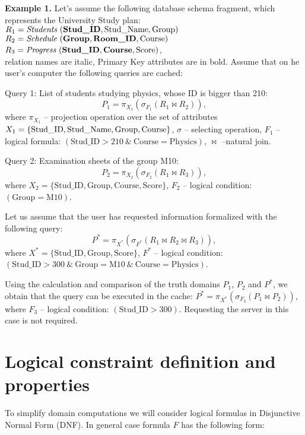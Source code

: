 \documentclass{article}
\begin{document}
{\bf Example 1.} Let's assume the following database schema fragment, which
represents the University Study plan:\\
$R_1 =\mbox{\it Students}\ (\mbox{\bf Stud\_ID}, \mbox{Stud\_Name},
\mbox{Group})$\\
$R_2 =\mbox{\it Schedule}\ (\mbox{\bf Group}, \mbox{\bf Room\_ID},
\mbox{Course})$\\
$R_3 =\mbox{\it Progress}\ (\mbox{\bf Stud\_ID}, \mbox{\bf Course},
\mbox{Score})$,\\
relation names are italic, Primary Key attributes are in bold. Assume that on 
he user's computer the following queries are cached:

Query 1: List of students studying physics, whose ID is bigger than 210:
$$P_1 = \pi_{X_1}(\sigma_{F_1} (R_1 \Join R_2)),$$
where $\pi_{X_1}$ -- projection operation over the set of attributes
$X_1 = \{\text{Stud\_ID},\\
\text{Stud\_Name}, \text{Group}, \text{Course}\}$,
$\sigma$ -- selecting operation,
$F_1$ -- logical formula: $(\text{Stud\_ID} > 210\ \&\ \text{Course} =
\text{Physics})$, $\Join$ --natural join.

Query 2: Examination sheets of the group M10:
$$P_2 = \pi_{X_2}(\sigma_{F_2} (R_1 \Join R_3)),$$
where
$X_2 = \{\text{Stud\_ID}, \text{Group}, \text{Course}, \text{Score}\}$, $F_2$
-- logical condition:\\
$(\text{Group}=\text{M10})$.

Let us assume that the user has requested information formalized with the
following query:
$$P^{\ast} = \pi_{X^{\ast}}(\sigma_{F^{\ast}} (R_1 \Join R_2 \Join R_3 )),$$
where $X^{\ast}= \{\text{Stud\_ID}, \text{Group}, \text{Score}\}$, $F^{\ast}$
-- logical condition: $(\text{Stud\_ID} > 300\ \&\ \text{Group} =
\text{M10}\ \&\ \text{Course} = \text{Physics})$.

Using the calculation and comparison of the truth domains $P_1$, $P_2$ and
$P^{\ast}$, we obtain that the query can be executed in the cache:
$P^{\ast} =\pi_{X^{\ast}}(\sigma_{F_3} (P_1 \Join P_2 ))$, where $F_3$
-- logical condition: $(\text{Stud\_ID} > 300)$. Requesting the server in this
case is not required.


\section{Logical constraint definition and properties}
To simplify domain computations we will consider logical formulas in
Disjunctive Normal Form (DNF). In general case formula $F$ has the following
form:
\end{document}
